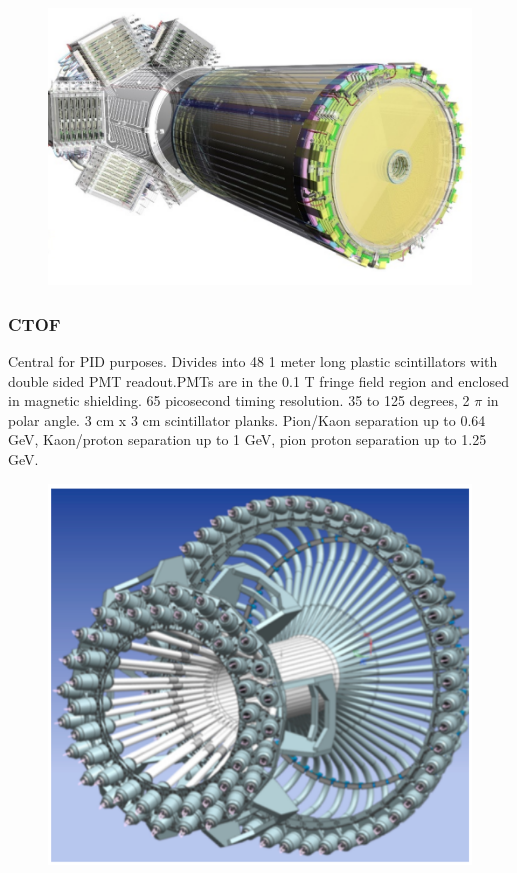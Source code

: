 		        
		        						
									
			 \begin{figure}[H]
    			\centering
    			\includegraphics[width=12cm]{Chapters/Ch2-Experiment/clas-12-system/pics/cd/MVT.PNG}
			\end{figure}
 
    
        \subsubsection{CTOF}
            Central for PID purposes. Divides into 48 1 meter long plastic scintillators with double sided PMT readout.PMTs are in the 0.1 T fringe field region and enclosed in magnetic shielding. 65 picosecond timing resolution. 35 to 125 degrees, 2 $\pi$ in polar angle. 3 cm x 3 cm scintillator planks. Pion/Kaon separation up to 0.64 GeV, Kaon/proton separation up to 1 GeV, pion proton separation up to 1.25 GeV.  
            
            						
			 \begin{figure}[H]
    			\centering
    			\includegraphics[width=12cm]{Chapters/Ch2-Experiment/clas-12-system/pics/cd/CTOF.PNG}
			\end{figure}
            
